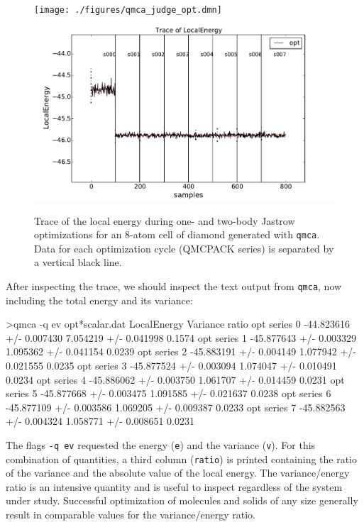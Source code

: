 \begin{figure}
\begin{center}
\ifdefined\HCode  
\texttt{[image: ./figures/qmca\_judge\_opt.dmn]}
\else
\includegraphics[trim = 0mm 0mm 0mm 0mm, clip,width=0.9\columnwidth]{./figures/qmca_judge_opt.pdf}
\fi
\end{center}
\caption{Trace of the local energy during one- and two-body Jastrow optimizations for an 8-atom cell of diamond generated with \texttt{qmca}.  Data for each optimization cycle (QMCPACK series) is separated by a vertical black line.
}
\label{fig:qmca_judge_opt}
\end{figure}

After inspecting the trace, we should inspect the text output 
from \texttt{qmca}, now including the total energy and its variance:
\begin{shade}
>qmca -q ev opt*scalar.dat
                            LocalEnergy               Variance           ratio 
opt  series 0  -44.823616 +/- 0.007430   7.054219 +/- 0.041998   0.1574 
opt  series 1  -45.877643 +/- 0.003329   1.095362 +/- 0.041154   0.0239 
opt  series 2  -45.883191 +/- 0.004149   1.077942 +/- 0.021555   0.0235 
opt  series 3  -45.877524 +/- 0.003094   1.074047 +/- 0.010491   0.0234 
opt  series 4  -45.886062 +/- 0.003750   1.061707 +/- 0.014459   0.0231 
opt  series 5  -45.877668 +/- 0.003475   1.091585 +/- 0.021637   0.0238 
opt  series 6  -45.877109 +/- 0.003586   1.069205 +/- 0.009387   0.0233 
opt  series 7  -45.882563 +/- 0.004324   1.058771 +/- 0.008651   0.0231 
\end{shade}
\noindent
The flags \texttt{-q ev} requested the energy (\texttt{e}) and 
the variance (\texttt{v}).  For this combination of quantities, a 
third column (\texttt{ratio}) is printed containing the ratio 
of the variance and the absolute value of the local energy.
The variance/energy ratio is an intensive quantity and is useful  
to inspect regardless of the system under study.  Successful 
optimization of molecules and solids of any size generally result 
in comparable values for the variance/energy ratio. 

